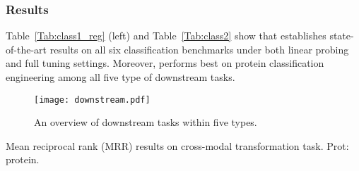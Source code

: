 \subsubsection{Results}
Table~\ref{Tab:class1_reg} (left) and Table~\ref{Tab:class2} show that \ourapproach establishes state-of-the-art results on all six classification benchmarks under both linear probing and full tuning settings.
Moreover, \ourapproach performs best on protein classification engineering among all five type of downstream tasks.
\begin{figure*}[htbp]
    \centering
    \texttt{[image: downstream.pdf]}
    \vspace{-0.5em}
    \caption{An overview of downstream tasks within five types.}
    \label{Fig:downstream}
\end{figure*}
\begin{table*}[!ht]
\begin{minipage}{0.49\textwidth}
    \caption{Mean reciprocal rank (MRR) results on cross-modal transformation task. Prot: protein.}\vspace{-1em}
    \label{Tab:trans}
    \setlength{\tabcolsep}{0.3em}
    \begin{center}
    \vspace{-1em}
    \end{center}
\end{minipage}
\hfill
\begin{minipage}{0.49\textwidth}
    \caption{Results on semantic similarity inference (Sim) and protein-protein interaction prediction (PPI) tasks.}\vspace{-1em}

\end{minipage}
\end{table*}
